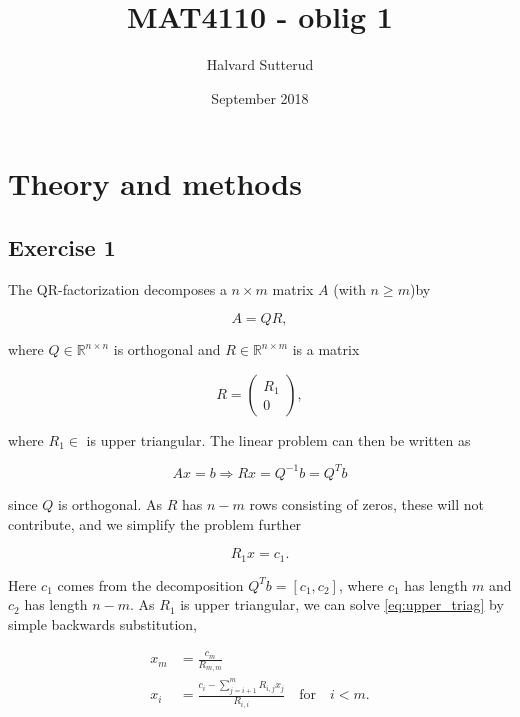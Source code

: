 \documentclass[a11paper, 10pt]{article}
\title{MAT4110 - oblig 1}
\author{Halvard Sutterud }
\date{September 2018}
\begin{document}
\maketitle

\section{Theory and methods}
\subsection*{Exercise 1}
The QR-factorization decomposes a $n\times m$ matrix $A$ (with $n \geq m$)by

\begin{equation}
    A = QR,
\end{equation}

where $Q \in \mathbb{R}^{n \times n}$ is orthogonal and $R \in \mathbb{R}^{n\times m}$
is a matrix 

\begin{equation}
    R = \begin{pmatrix}
        R_1 \\ 0
    \end{pmatrix},
\end{equation}

where $R_1 \in \mathbb{}$ is upper triangular. The linear problem can then
be written as 

\begin{equation}
    Ax = b \Rightarrow Rx = Q^{-1}b = Q^Tb
\end{equation}

since $Q$ is orthogonal. As $R$ has $n-m$ rows consisting of zeros, these
will not contribute, and we simplify the problem further

\begin{equation} \label{eq:upper_triag}
    R_1 x =  c_1.%
\end{equation}

Here $c_1$ comes from the decomposition $Q^Tb = [c_1, c_2]$, where $c_1$
has length $m$ and $c_2$ has length $n-m$. As $R_1$ is upper triangular, we
can solve \cref{eq:upper_triag} by simple backwards substitution, 

\begin{align*}
    x_m &= \frac{c_m}{R_{m,m}}\\
    x_i &= \frac{c_i - \sum_{j=i+1}^{m} R_{i,j} x_j}{R_{i,i}} \quad \text{for}\quad i <
    m.
\end{align*}
\end{document}
